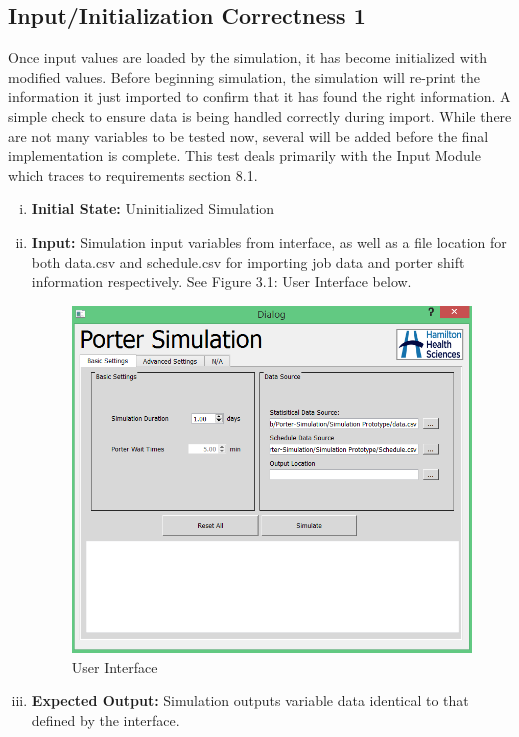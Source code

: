 \documentclass[paper=letter, fontsize=10pt]{scrartcl}
\numberwithin{equation}{section}		%
\numberwithin{figure}{section}			%
\numberwithin{table}{section}				%
\begin{document}
\subsection{Input/Initialization Correctness 1}
Once input values are loaded by the simulation, it has become initialized with modified values. Before beginning simulation, the simulation will re-print the information it just imported to confirm that it has found the right information. A simple check to ensure data is being handled correctly during import. While there are not many variables to be tested now, several will be added before the final implementation is complete. This test deals primarily with the Input Module which traces to requirements section 8.1.
\begin{enumerate}[(i)]
	\item \textbf{Initial State:} Uninitialized Simulation   
	\item \textbf{Input:} Simulation input variables from interface, as well as a file location for both data.csv and schedule.csv for importing job data and porter shift information respectively. See Figure 3.1: User Interface below.
	\begin{figure}[!htbp]
		\begin{center}
			\includegraphics[width=1\columnwidth, height=0.5\textheight, keepaspectratio]{Interface.png}
			\caption{User Interface}
		\end{center}
	\end{figure}
	\item \textbf{Expected Output:} Simulation outputs variable data identical to that defined by the interface. 

\end{enumerate}
\end{document}
